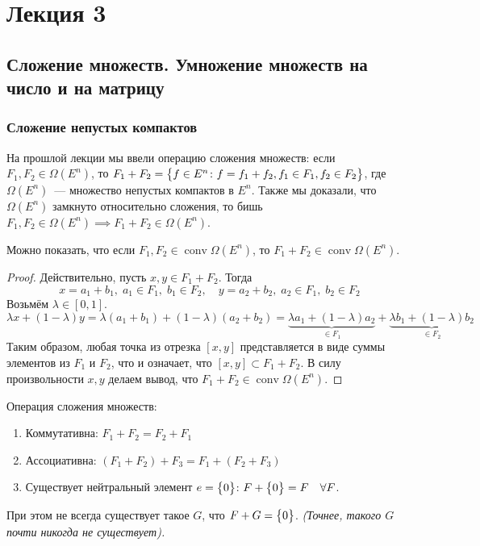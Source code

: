 \section{Лекция 3}

\subsection{Сложение множеств. Умножение множеств на число и на матрицу}

\subsubsection{Сложение непустых компактов}

На прошлой лекции мы ввели операцию сложения множеств:
если $F_{1}, F_{2} \in \Omega(E^{n})$, то $F_{1} + F_{2} = \bigl\{ f \in E^{n}\colon f = f_1 + f_2, f_1 \in F_1, f_2 \in F_2 \bigr\}$,
где $\Omega(E^{n})$~--- множество непустых компактов в $E^{n}$.
Также мы доказали, что $\Omega(E^{n})$ замкнуто относительно сложения, то бишь
$F_{1}, F_{2} \in \Omega(E^{n}) \implies F_{1} + F_{2} \in \Omega(E^{n})$.

Можно показать, что если $F_{1}, F_{2} \in \operatorname{conv} \Omega(E^{n})$, то $F_{1} + F_{2} \in \operatorname{conv} \Omega(E^{n})$.
\begin{proof}
    Действительно, пусть $x, y \in F_1 + F_2$.
    Тогда 
    \begin{equation*}
        x = a_1 + b_1, \; a_1 \in F_1,\; b_1 \in F_2, \quad y = a_2 + b_2,\; a_2 \in F_1,\; b_2 \in F_2
    \end{equation*}
    Возьмём $\lambda \in [0, 1]$.
    \begin{equation*}
        \lambda x + (1 - \lambda)y = 
        \lambda(a_1 + b_1) + (1 - \lambda)(a_2 + b_2) =
        \underbrace{\lambda a_1 + (1 - \lambda) a_2}_{\in F_1} + \underbrace{\lambda b_1 + (1 - \lambda)b_2}_{\in F_2}
    \end{equation*}
    Таким образом, любая точка из отрезка $[x, y]$ представляется в виде суммы элементов из $F_1$ и $F_2$, что и означает, что $[x, y] \subset F_1 + F_2$.
    В силу произвольности $x, y$ делаем вывод, что $F_1 + F_2 \in \operatorname{conv} \Omega(E^n)$.
\end{proof}

\vspace{5mm}
Операция сложения множеств:
\begin{enumerate}
    \item Коммутативна: $F_1 + F_2 = F_2 + F_1$
    \item Ассоциативна: $(F_1 + F_2) + F_3 = F_1 + (F_2 + F_3)$
    \item Существует нейтральный элемент $e = \bigl\{ 0 \bigr\}$: $F + \bigl\{ 0 \bigr\} = F \quad \forall F$.
\end{enumerate}
При этом не всегда существует такое $G$, что $F + G = \bigl\{ 0 \bigr\}$.
\textit{(Точнее, такого $G$ почти никогда не существует).}

